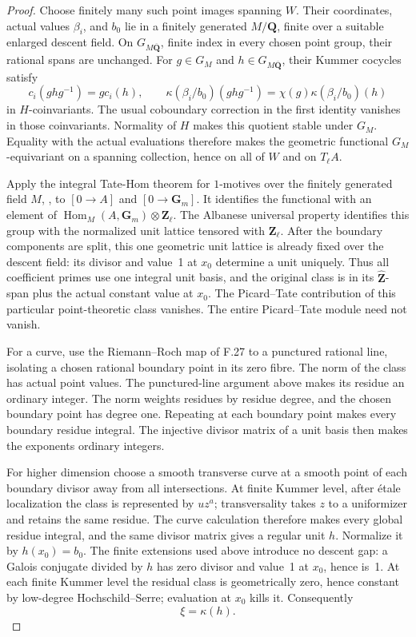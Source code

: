 \begin{proof}
Choose finitely many such point images spanning \(W\). Their coordinates,
actual values \(\beta_i\), and \(b_0\) lie in a finitely generated
\(M/\mathbf Q\), finite over a suitable enlarged descent field. On
\(G_{M\overline{\mathbf Q}}\), finite index in every chosen point group,
their rational spans are unchanged. For \(g\in G_M\) and
\(h\in G_{M\overline{\mathbf Q}}\), their Kummer cocycles satisfy
\[
 c_i(ghg^{-1})=g c_i(h),\qquad
 \kappa(\beta_i/b_0)(ghg^{-1})
      =\chi(g)\kappa(\beta_i/b_0)(h)                         \tag{F.45.9}
\]
in \(H\)-coinvariants. The usual coboundary correction in the first
identity vanishes in those coinvariants. Normality of \(H\) makes this
quotient stable under \(G_M\). Equality with the actual evaluations
therefore makes the geometric functional \(G_M\)-equivariant on a
spanning collection, hence on all of \(W\) and on \(T_\ell A\).

Apply the integral Tate-Hom theorem for $1$-motives over the finitely generated field \(M\), \citet[original Theorem~4.3(ii), p.~676]{F_Jannsen1995}, to
\([0\to A]\) and \([0\to\mathbf G_m]\). It identifies the functional
with an element of
\(\operatorname{Hom}_M(A,\mathbf G_m)\otimes\mathbf Z_\ell\).
The Albanese universal property identifies this group with the normalized
unit lattice tensored with \(\mathbf Z_\ell\). After the boundary
components are split, this one geometric unit lattice is already fixed
over the descent field: its divisor and value~1 at \(x_0\) determine a
unit uniquely. Thus all coefficient primes use one integral unit basis,
and the original class is in its \(\widehat{\mathbf Z}\)-span plus the
actual constant value at \(x_0\). The Picard–Tate contribution of this
particular point-theoretic class vanishes. The entire Picard–Tate module
need not vanish.

For a curve, use the Riemann–Roch map of F.27 to a punctured rational
line, isolating a chosen rational boundary point in its zero fibre.
The norm of the class has actual point values. The punctured-line argument above makes its
residue an ordinary integer. The norm weights residues by residue degree,
and the chosen boundary point has degree one. Repeating at each boundary
point makes every boundary residue integral. The injective divisor
matrix of a unit basis then makes the exponents ordinary integers.

For higher dimension choose a smooth transverse curve at a smooth point
of each boundary divisor away from all intersections. At finite Kummer
level, after étale localization the class is represented by \(u z^a\);
transversality takes \(z\) to a uniformizer and retains the same residue.
The curve calculation therefore makes every global residue integral,
and the same divisor matrix gives a regular unit \(h\). Normalize it by
\(h(x_0)=b_0\). The finite extensions used above introduce no descent
gap: a Galois conjugate divided by \(h\) has zero divisor and value~1 at
\(x_0\), hence is~1. At each finite Kummer level the residual class is
geometrically zero, hence constant by low-degree Hochschild–Serre;
evaluation at \(x_0\) kills it. Consequently
\[
                              \xi=\kappa(h).               \tag{F.45.10}
\]


\end{proof}
